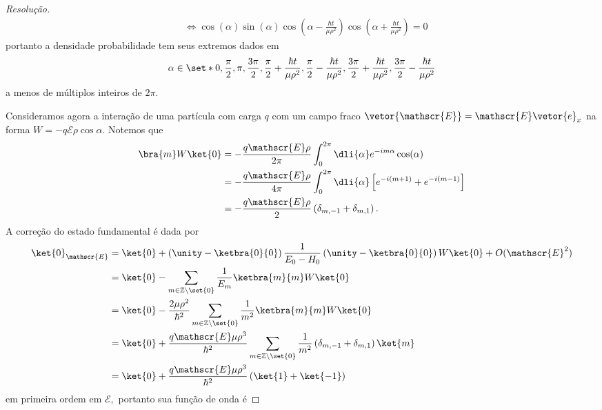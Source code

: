 \begin{proof}[Resolução]
\begin{align*}
                                                     &\iff \cos(\alpha) \sin(\alpha) \cos\left(\alpha - \frac{\hbar t}{\mu \rho^2}\right) \cos\left(\alpha + \frac{\hbar t}{\mu \rho^2}\right) = 0
   \end{align*}
   portanto a densidade probabilidade tem seus extremos dados em 
   \begin{equation*}
      \alpha \in \set*{0, \frac{\pi}{2}, \pi, \frac{3\pi}{2}, \frac{\pi}{2} + \frac{\hbar t}{\mu \rho^2}, \frac{\pi}{2} - \frac{\hbar t}{\mu \rho^2}, \frac{3\pi}{2} + \frac{\hbar t}{\mu \rho^2}, \frac{3\pi}{2} - \frac{\hbar t}{\mu \rho^2}}
   \end{equation*}
   a menos de múltiplos inteiros de \(2\pi.\)

   Consideramos agora a interação de uma partícula com carga \(q\) com um campo fraco \(\vetor{\mathscr{E}} = \mathscr{E} \vetor{e}_x\) na forma \(W = - q \mathscr{E} \rho \cos \alpha.\) Notemos que
   \begin{align*}
      \bra{m}W\ket{0} &= -\frac{q \mathscr{E} \rho}{2\pi} \int_{0}^{2\pi} \dli{\alpha} e^{-im \alpha} \cos(\alpha)\\
                      &= -\frac{q \mathscr{E} \rho}{4\pi} \int_{0}^{2\pi} \dli{\alpha} \left[e^{-i(m + 1)}  + e^{-i(m - 1)}\right]\\
                      &= - \frac{q \mathscr{E} \rho}{2} \left(\delta_{m,-1} + \delta_{m,1}\right).
   \end{align*}
   A correção do estado fundamental é dada por
   \begin{align*}
      \ket{0}_\mathscr{E} &= \ket{0} +  \left(\unity - \ketbra{0}{0}\right)\frac{1}{E_0 - H_0}\left(\unity - \ketbra{0}{0}\right) W\ket{0} + O(\mathscr{E}^2)\\
                          &= \ket{0} - \sum_{m \in \mathbb{Z}\setminus\set{0}} \frac{1}{E_m}\ketbra{m}{m} W \ket{0}\\
                          &= \ket{0} - \frac{2\mu\rho^2}{\hbar^2} \sum_{m \in \mathbb{Z}\setminus\set{0}}{\frac{1}{m^2} \ketbra{m}{m} W \ket{0}}\\
                          &= \ket{0} + \frac{q\mathscr{E} \mu \rho^3}{\hbar^2} \sum_{m \in \mathbb{Z}\setminus\set{0}} \frac{1}{m^2} \left(\delta_{m,-1} + \delta_{m,1}\right)\ket{m}\\
                          &= \ket{0} + \frac{q \mathscr{E}\mu \rho^3}{\hbar^2}\left(\ket{1} + \ket{-1}\right)
   \end{align*}
   em primeira ordem em \(\mathscr{E},\) portanto sua função de onda é

\end{proof}
